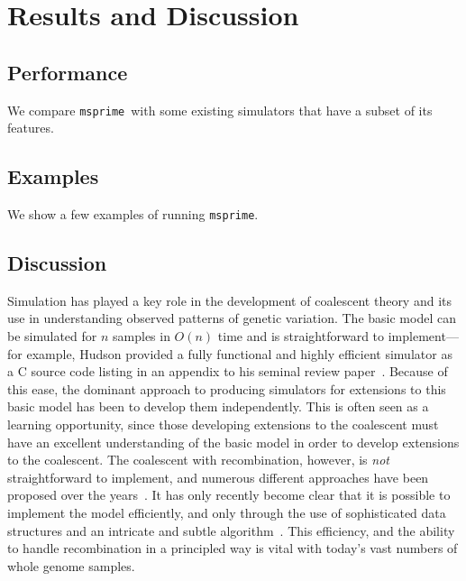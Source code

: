 \documentclass{article}
\newcommand{\msprime}[0]{\texttt{msprime}}
\begin{document}

\section*{Results and Discussion}
\subsection*{Performance}
We compare \msprime\ with some existing simulators that have a subset of its
features.


\subsection*{Examples}
We show a few examples of running \msprime.

\subsection*{Discussion}
Simulation has played a key role in the development of coalescent theory
and its use in understanding observed patterns of genetic variation.
The basic model can be simulated for $n$ samples in $O(n)$ time
and is straightforward to implement---for example, Hudson provided a fully
functional and highly efficient simulator as a C source code listing in an
appendix to his seminal review paper~\citep{hudson1990gene}. Because of
this ease, the dominant approach to producing simulators for extensions
to this basic model has been to develop them independently. This is
often seen as a learning opportunity, since those developing extensions
to the coalescent must have an excellent understanding of the basic
model in order to develop extensions to the coalescent.
The coalescent with recombination, however, is \emph{not} straightforward
to implement, and numerous different approaches have been
proposed over the
years~\citep{hudson1983properties,griffiths1997ancestral,wiuf1999recombination,
mcvean2005approximating}. It has only recently become clear that it is
possible to implement the model efficiently, and only through the use
of sophisticated data structures and an intricate and subtle
algorithm~\citep{kelleher2016efficient}.
This efficiency, and the ability to handle recombination in a principled
way is vital with today's vast numbers of whole genome samples.
\end{document}
